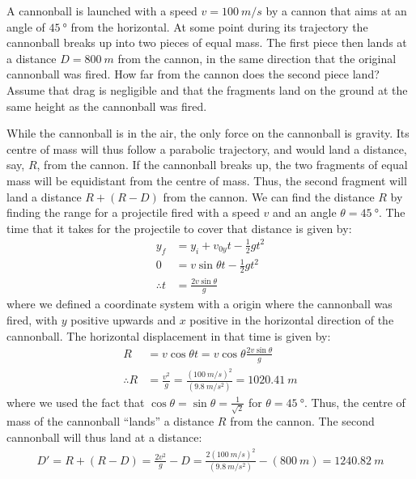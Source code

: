 \question A cannonball is launched with a speed $v=\SI{100}{m/s}$ by a cannon that aims at an angle of $\SI{45}{\degree}$ from the horizontal. At some point during its trajectory the cannonball breaks up into two pieces of equal mass. The first piece then lands at a distance $D=\SI{800}{m}$ from the cannon, in the same direction that the original cannonball was fired. How far from the cannon does the second piece land? Assume that drag is negligible and that the fragments land on the ground at the same height as the cannonball was fired.
\begin{solution}
While the cannonball is in the air, the only force on the cannonball is gravity. Its centre of mass will thus follow a parabolic trajectory, and would land a distance, say, $R$, from the cannon. If the cannonball breaks up, the two fragments of equal mass will be equidistant from the centre of mass. Thus, the second fragment will land a distance $R+(R-D)$ from the cannon. We can find the distance $R$ by finding the range for a projectile fired with a speed $v$ and an angle $\theta=\SI{45}{\degree}$. The time that it takes for the projectile to cover that distance is given by:
\begin{align*}
y_f&=y_i+v_{0y}t-\frac{1}{2}gt^2\\
0&= v\sin\theta t-\frac{1}{2}gt^2\\
\therefore t&=\frac{2v\sin\theta}{g}
\end{align*}
where we defined a coordinate system with a origin where the cannonball was fired, with $y$ positive upwards and $x$ positive in the horizontal direction of the cannonball. The horizontal displacement in that time is given by:
\begin{align*}
R&=v\cos\theta t=v\cos\theta\frac{2v\sin\theta}{g}\\
\therefore R&=\frac{v^2}{g}=\frac{(\SI{100}{m/s})^2}{(\SI{9.8}{m/s^2})}=\SI{1020.41}{m}
\end{align*}
where we used the fact that $\cos\theta=\sin\theta=\frac{1}{\sqrt 2}$ for $\theta=\SI{45}{\degree}$. Thus, the centre of mass of the cannonball ``lands'' a distance $R$ from the cannon. The second cannonball will thus land at a distance:
\begin{align*}
D' = R+(R-D)=\frac{2v^2}{g} - D = \frac{2(\SI{100}{m/s})^2}{(\SI{9.8}{m/s^2})}-(\SI{800}{m})= \SI{1240.82}{m}
\end{align*}
\end{solution}

